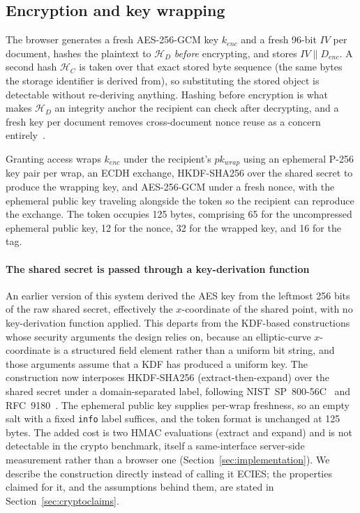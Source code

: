 \documentclass[preprint,12pt]{elsarticle}
\begin{document}
\subsection{Encryption and key wrapping}
\label{sec:docencryption}

The browser generates a fresh AES-256-GCM key $k_{enc}$ and a fresh 96-bit
$\mathit{IV}$ per document, hashes the plaintext to $\mathcal{H}_D$
\emph{before} encrypting, and stores $\mathit{IV} \| D_{enc}$. A second hash
$\mathcal{H}_C$ is taken over that exact stored byte sequence (the same bytes
the storage identifier is derived from), so substituting the stored object is
detectable without re-deriving anything. Hashing before encryption is what makes
$\mathcal{H}_D$ an integrity anchor the recipient can check after decrypting,
and a fresh key per document removes cross-document nonce reuse as a concern
entirely~\cite{nist80038d}.

Granting access wraps $k_{enc}$ under the recipient's $pk_{wrap}$ using an
ephemeral P-256 key pair per wrap, an ECDH exchange, HKDF-SHA256 over the
shared secret to produce the wrapping key, and AES-256-GCM under a fresh nonce,
with the ephemeral public key traveling alongside the token so the recipient
can reproduce the exchange. The token occupies 125 bytes, comprising 65 for the
uncompressed ephemeral public key, 12 for the nonce, 32 for the wrapped key,
and 16 for the tag.

\paragraph{The shared secret is passed through a key-derivation function}
An earlier version of this system derived the AES key from the leftmost 256
bits of the raw shared secret, effectively the $x$-coordinate of the shared
point, with no key-derivation function applied. This departs from the
KDF-based constructions whose security arguments the design relies on,
because an elliptic-curve $x$-coordinate is a structured field element
rather than a uniform bit string, and those arguments assume that a KDF has
produced a uniform key. The construction now interposes
HKDF-SHA256 (extract-then-expand) over the shared secret under a
domain-separated label, following NIST~SP~800-56C~\cite{nist80056c} and
RFC~9180~\cite{rfc9180}. The ephemeral public key supplies per-wrap freshness,
so an empty salt with a fixed \texttt{info} label suffices, and the token
format is unchanged at 125 bytes. The added cost is two HMAC evaluations
(extract and expand) and is not detectable in the crypto benchmark, itself
a same-interface server-side measurement rather than a browser one
(Section~\ref{sec:implementation}). We describe the construction directly
instead of calling it ECIES; the properties claimed for it, and the
assumptions behind them, are stated in Section~\ref{sec:cryptoclaims}.
\end{document}
